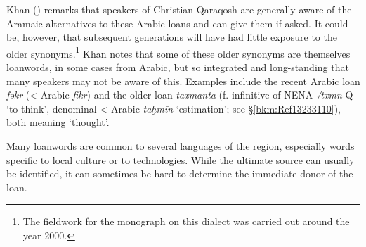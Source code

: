 \documentclass[output=paper]{langsci/langscibook}
\begin{document}
Khan (\citeyear[516]{Khan2002}) remarks that speakers of Christian Qaraqosh are generally aware of the Aramaic alternatives to these Arabic loans and can give them if asked. It could be, however, that subsequent generations will have had little exposure to the older synonyms.\footnote{The fieldwork for the monograph on this dialect was carried out around the year 2000.} Khan notes that some of these older synonyms are themselves loanwords, in some cases from Arabic, but so integrated and long-standing that many speakers may not be aware of this. Examples include the recent Arabic loan \textit{fəkr} (< Arabic \textit{fikr}) and the older loan \textit{taxmanta} (f. infinitive of NENA \textit{√txmn} Q ‘to think’, denominal < Arabic \textit{taḫmīn} ‘estimation’; see §\ref{bkm:Ref13233110}), both meaning ‘thought’.

Many loanwords are common to several languages of the region, especially words specific to local culture or to technologies. While the ultimate source can usually be identified, it can sometimes be hard to determine the immediate donor of the loan. 
\end{document}
